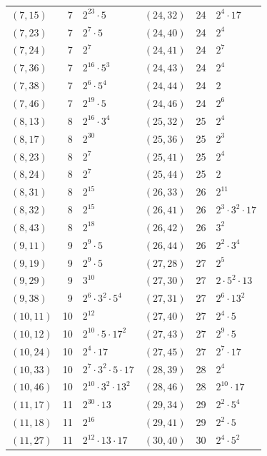\documentclass[11pt]{article}
\begin{document}
\begin{longtable}{@{}lrl@{\qquad}lrl@{}}
$(7,15)$ & 7 & $2^{23}\cdot 5$ & $(24,32)$ & 24 & $2^{4}\cdot 17$\\
$(7,23)$ & 7 & $2^{7}\cdot 5$ & $(24,40)$ & 24 & $2^{4}$\\
$(7,24)$ & 7 & $2^{7}$ & $(24,41)$ & 24 & $2^{7}$\\
$(7,36)$ & 7 & $2^{16}\cdot 5^{3}$ & $(24,43)$ & 24 & $2^{4}$\\
$(7,38)$ & 7 & $2^{6}\cdot 5^{4}$ & $(24,44)$ & 24 & $2$\\
$(7,46)$ & 7 & $2^{19}\cdot 5$ & $(24,46)$ & 24 & $2^{6}$\\
$(8,13)$ & 8 & $2^{16}\cdot 3^{4}$ & $(25,32)$ & 25 & $2^{4}$\\
$(8,17)$ & 8 & $2^{30}$ & $(25,36)$ & 25 & $2^{3}$\\
$(8,23)$ & 8 & $2^{7}$ & $(25,41)$ & 25 & $2^{4}$\\
$(8,24)$ & 8 & $2^{7}$ & $(25,44)$ & 25 & $2$\\
$(8,31)$ & 8 & $2^{15}$ & $(26,33)$ & 26 & $2^{11}$\\
$(8,32)$ & 8 & $2^{15}$ & $(26,41)$ & 26 & $2^{3}\cdot 3^{2}\cdot 17$\\
$(8,43)$ & 8 & $2^{18}$ & $(26,42)$ & 26 & $3^{2}$\\
$(9,11)$ & 9 & $2^{9}\cdot 5$ & $(26,44)$ & 26 & $2^{2}\cdot 3^{4}$\\
$(9,19)$ & 9 & $2^{9}\cdot 5$ & $(27,28)$ & 27 & $2^{5}$\\
$(9,29)$ & 9 & $3^{10}$ & $(27,30)$ & 27 & $2\cdot 5^{2}\cdot 13$\\
$(9,38)$ & 9 & $2^{6}\cdot 3^{2}\cdot 5^{4}$ & $(27,31)$ & 27 & $2^{6}\cdot 13^{2}$\\
$(10,11)$ & 10 & $2^{12}$ & $(27,40)$ & 27 & $2^{4}\cdot 5$\\
$(10,12)$ & 10 & $2^{10}\cdot 5\cdot 17^{2}$ & $(27,43)$ & 27 & $2^{9}\cdot 5$\\
$(10,24)$ & 10 & $2^{4}\cdot 17$ & $(27,45)$ & 27 & $2^{7}\cdot 17$\\
$(10,33)$ & 10 & $2^{7}\cdot 3^{2}\cdot 5\cdot 17$ & $(28,39)$ & 28 & $2^{4}$\\
$(10,46)$ & 10 & $2^{10}\cdot 3^{2}\cdot 13^{2}$ & $(28,46)$ & 28 & $2^{10}\cdot 17$\\
$(11,17)$ & 11 & $2^{30}\cdot 13$ & $(29,34)$ & 29 & $2^{2}\cdot 5^{4}$\\
$(11,18)$ & 11 & $2^{16}$ & $(29,41)$ & 29 & $2^{2}\cdot 5$\\
$(11,27)$ & 11 & $2^{12}\cdot 13\cdot 17$ & $(30,40)$ & 30 & $2^{4}\cdot 5^{2}$\\

\end{longtable}
\end{document}
